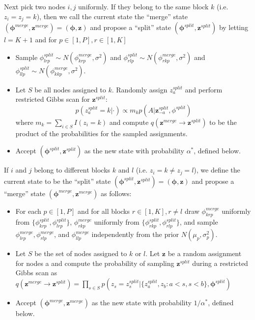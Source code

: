 \documentclass{article}
\begin{document}
Next pick two nodes $i,j$ uniformly.  If they belong to the same block $k$ (i.e. $z_i=z_j=k$), then we call the current state the ``merge'' state $(\boldsymbol{\phi}^{merge},\mathbf{z}^{merge}) = (\boldsymbol{\phi},\mathbf{z})$ and propose a ``split'' state $(\boldsymbol{\phi}^{split},\mathbf{z}^{split})$ by letting $l=K+1$ and for $p \in [1,P], r \in [1,K]$
\begin{itemize}
\item Sample $\phi_{lrp}^{split} \sim N(\phi_{krp}^{merge},\sigma^2)$ and $\phi_{rlp}^{split} \sim N(\phi_{rkp}^{merge},\sigma^2)$ and $\phi_{llp}^{split} \sim N(\phi_{kkp}^{merge}, \sigma^2)$.
\item Let $S$ be all nodes assigned to $k$.  Randomly assign $z_a^{split}$ and perform restricted Gibbs scan for $\mathbf{z}^{split}$: $$p(z_{a}^{split}=k|\cdot)  \propto m_k p(A|\mathbf{z}^{split}_{-a},\phi^{split})$$
where $m_k=\sum_{i \in S}I(z_i=k)$ and compute $q( \mathbf{z}^{merge} \rightarrow \mathbf{z}^{split})$ to be the product of the probabilities for the sampled assignments.
\item Accept  $(\boldsymbol{\phi}^{split},\mathbf{z}^{split})$ as the new state with probability $\alpha^*$, defined below.
\end{itemize}

  If $i$ and $j$ belong to different blocks $k$ and $l$ (i.e. $z_i = k \ne z_j=l$), we define the current state to be the ``split'' state  $(\boldsymbol{\phi}^{split},\mathbf{z}^{split}) = (\boldsymbol{\phi},\mathbf{z})$ and propose a ``merge'' state $(\boldsymbol{\phi}^{merge},\mathbf{z}^{merge})$ as follows:
\begin{itemize}
\item For each $p \in [1,P]$ and for all blocks $r \in [1,K], r\ne l$ draw $\phi_{krp}^{merge}$ uniformly from $\{\phi_{krp}^{split}, \phi_{lrp}^{split}\}$,  $\phi_{rkp}^{merge}$ uniformly from $\{\phi_{rkp}^{split}, \phi_{rlp}^{split}\}$, and sample $\phi_{lrp}^{merge},\phi_{rlp}^{merge}$, and $\phi_{llp}^{merge}$ independently from the prior $N(\mu_p,\sigma^2_p)$.
\item Let $S$ be the set of nodes assigned to $k$ or $l$. Let $\mathbf{z}$ be a random assignment for nodes a and compute the probability of sampling $\mathbf{z}^{split}$ during a restricted Gibbs scan as $q( \mathbf{z}^{merge} \rightarrow \mathbf{z}^{split}) = \prod_{s \in S} p(z_{s}=z_s^{split} |\{ z_a^{split},z_{b}: a  < s, s < b\}, \boldsymbol{\phi}^{split})$
\item Accept $(\boldsymbol{\phi}^{merge},\mathbf{z}^{merge})$ as the new state with probability $1/\alpha^*$, defined below.
\end{itemize}
\end{document}
